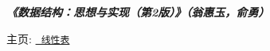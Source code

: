 {\itshape {\bfseries{《数据结构：思想与实现（第2版）》（翁惠玉，俞勇）}}}

主页\+: \href{https://grwei.github.io/data-structure-homework/DS_Ch2/doc/html/index.html}{\texttt{ 线性表}} 